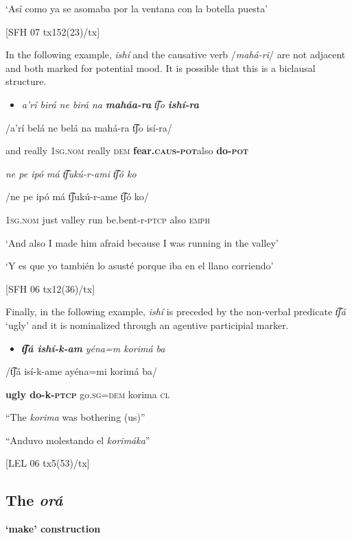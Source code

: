 ‘Así como ya se asomaba por la ventana con la botella puesta’

 [SFH 07 tx152(23)/tx]

In the following example, \textit{ishí} and the causative verb /\textit{mahá-ri}/ are not adjacent and both marked for potential mood. It is possible that this is a biclausal structure.

\begin{itemize}
\item \textit{a’rí   birá  ne     birá   na} \textbf{\textit{maháa-ra}} \textit{t͡ʃo} \textbf{\textit{ishí-ra}}   
\end{itemize}

/a’rí  belá  ne    belá  na  mahá-ra  t͡ʃo  isí-ra/

and  really  1\textsc{sg.nom}  really  \textsc{dem} \textbf{fear.\textsc{caus}}\textbf{{}-}\textbf{\textsc{pot}}also  \textbf{do-\textsc{pot}} 

  \textit{ne    pe   ipó   má   t͡ʃukú-r-ami   t͡ʃó   ko}

  /ne    pe  ipó  má  t͡ʃukú-r-ame  t͡ʃó  ko/

1\textsc{sg.nom} just  valley  run  be.bent-r-\textsc{ptcp} also  \textsc{emph}

  ‘And also I made him afraid because I was running in the valley’

‘Y es que yo también lo asusté porque iba en el llano corriendo’

  [SFH 06 tx12(36)/tx]

Finally, in the following example, \textit{ishí} is preceded by the non-verbal predicate \textit{t͡ʃá} ‘ugly’ and it is nominalized through an agentive participial marker.

\begin{itemize}
\item \textbf{\textit{t͡ʃá    ishí-k-am}} \textit{yéna=m   korimá   ba}
\end{itemize}

/t͡ʃá  isí-k-ame  ayéna=mi  korimá    ba/

\textbf{ugly   do-k-\textsc{ptcp} }go.\textsc{sg=dem} korima   \textsc{cl}

  “The \textit{korima} was bothering (us)”

“Anduvo molestando el \textit{korimáka}”

  [LEL 06 tx5(53)/tx]

\subsection{The \textit{orá} }\textbf{‘make’ construction}
\label{subsec: the ora 'make' construction}

